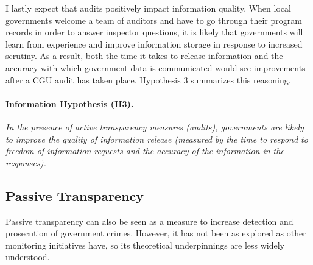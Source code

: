 \documentclass[11pt]{article}
\begin{document}
I lastly expect that audits positively impact information quality. When local governments welcome a team of auditors and have to go through their program records in order to answer inspector questions, it is likely that governments will learn from experience and improve information storage in response to increased scrutiny. As a result, both the time it takes to release information and the accuracy with which government data is communicated would see improvements after a CGU audit has taken place. Hypothesis 3 summarizes this reasoning.

\paragraph{Information Hypothesis (H3).} \emph{In the presence of active transparency measures (audits), governments are likely to improve the quality of information release (measured by the time to respond to freedom of information requests and the accuracy of the information in the responses).}

\subsection{Passive Transparency} \label{subsec:theory2_paper3}

Passive transparency can also be seen as a measure to increase detection and prosecution of government crimes. However, it has not been as explored as other monitoring initiatives have, so its theoretical underpinnings are less widely understood.
\end{document}

